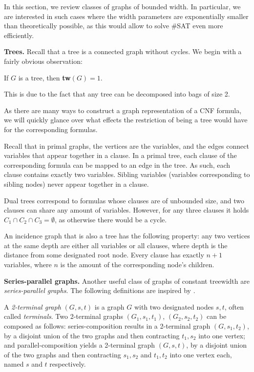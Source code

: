 In this section, we review classes of graphs of bounded width.
In particular, we are interested in such cases where the width parameters are exponentially smaller than theoretically possible, as this would allow to solve \#SAT even more efficiently.

\textbf{Trees.}
Recall that a tree is a connected graph without cycles.
We begin with a fairly obvious observation:

\begin{fact}
	If $G$ is a tree, then \textbf{tw}$(G) = 1$. 
	\label{gw:tree}
\end{fact}

\noindent
This is due to the fact that any tree can be decomposed into bags of size 2.
{\color{lightgray} As there are many ways to construct a graph representation of a CNF formula, we will quickly glance over what effects the restriction of being a tree would have for the corresponding formulas.

Recall that in primal graphs, the vertices are the variables, and the edges connect variables that appear together in a clause.
In a primal tree, each clause of the corresponding formula can be mapped to an edge in the tree.
As such, each clause contains exactly two variables.
Sibling variables (variables corresponding to sibling nodes) never appear together in a clause.

Dual trees correspond to formulas whose clauses are of unbounded size, and two clauses can share any amount of variables. However, for any three clauses it holds $C_1 \cap C_2 \cap C_3 = \emptyset$, as otherwise there would be a cycle.

An incidence graph that is also a tree has the following property: any two vertices at the same depth are either all variables or all clauses, where depth is the distance from some designated root node.
Every clause has exactly $n+1$ variables, where $n$ is the amount of the corresponding node's children.}

\textbf{Series-parallel graphs.}
Another useful class of graphs of constant treewidth are {\em series-parallel graphs}. The following definitions are inspired by \cite{DBLP:journals/corr/abs-2004-00547}.

A {\em 2-terminal graph} $(G, s, t)$ is a graph $G$ with two designated nodes $s, t$, often called {\em terminals}.
Two 2-terminal graphs $(G_1, s_1, t_1)$, $(G_2, s_2, t_2)$ can be composed as follows:
series-composition results in a 2-terminal graph $(G, s_1, t_2)$, by a disjoint union of the two graphs and then contracting $t_1, s_2$ into one vertex;
and parallel-composition yields a 2-terminal graph $(G, s, t)$, by a disjoint union of the two graphs and then contracting $s_1, s_2$ and $t_1, t_2$ into one vertex each, named $s$ and $t$ respectively.

